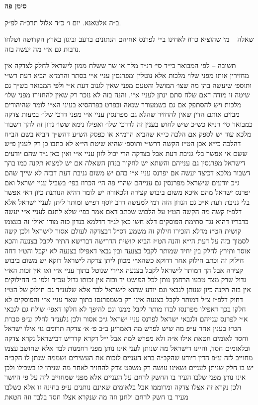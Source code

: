 \documentclass[12pt, openany]{book}
\newcommand{\chapname}{}
\newcommand{\newchap}[1]{
	\addcontentsline{toc}{chapter}{#1}
	\renewcommand{\chapname}{#1}
		\begin{center}
			\textbf{%
\fontsize{16pt}{16pt}\selectfont
				#1}
		\end{center}
}
\begin{document}
\newchap{סימן פה}
\begin{multicols}{2}
ב״ה אלטאנא. יום ו׳ כ״ד אלול תרכ״ה לפ״ק.\\\vspace{0pt}

שאלה – מי שהוציא כרוז לאחינו ב״י לפרנס אחיהם הנתונים ברעב וביגון בארץ הקדושה ושלחו נדבות גם א״י מה יעשה בזה.\\\vspace{0pt}

תשובה – לפי המבואר בי״ד סי׳ רנ״ד מלך או שר ששלח ממון לישראל לחלק לצדקה אין מחזירין אותו מפני שלו׳ מלכות אלא נוטלין ומפרנסין עניי א״י בסתר והרמ״א הביא דעת רש״י ותוספ׳ שיעשה בהן מה שצו׳ המושל והטעם מפני שאין לגנוב דעת א״י ולפי המבואר בש״ך גם שיטה זו מודה דאם שלח סתם ינתן לעניי א״י. והנה בזה לא נזכר רק שאין להחזירו מפני שלו׳ מלכות ויש להסתפק אם גם כשמעורר שנאה ובפרט בפרהסיא בעיני הא״י לומר שהיהודים מבזים אותם הדין שאין להחזיר שהלא גם מפרנסין עניי א״י מפני דרכי שלו׳ במעות צדקה כמבואר סי׳ רנ״א כש״כ שיש לחוש בענין זה לדרכי שלו׳ ואפילו נימא ששו׳ נדון זה להך דשבור מלכא עוד יש לספק אם הלכה כי״א שהביא הרמ״א או כפסק הש״ע דהש״ך הביא בשם הב״ח דהלכה כי״א אכן הט״ז הקשה דרש״י ותוספ׳ שהיא שיטת הי״א לא כתבו כן רק לענין פ״ש ששם אי אפשר בלי גניבת דעת אבל בצדקה הרי יכול לזון עניי א״י ואין כאן ג״ד שהם יודעים דישראל מפרנסין גם ענייהם והשתא יש לחקור בנדון השאלה אם יש למצוא תקנה כמו בהך דשבור מלכא דכיצד יעשה אם יפרנס עניי א״י בהם יש משום גניבת דעת דבזה לא שייך שהם ג״כ יודעים שישראל מפרנסין גם ענייהם שהרי פה הי׳ הכרוז בפי׳ בשביל עניי ישראל ואם יפרנס ישראל מהם איכא משום ביבוש קצירה ולכאורה יש לומר דהיא הנותנת כיון דאי אפשר בלי גניבת דעת א״כ גם הנדון הזה דמי למעשה דרב יוסף דפ״ש ומותר ליתן לעניי ישראל אלא דלפ״ז קשה מה הקשה הט״ז על הלבוש שכתב דאם אמר בפי׳ שלא לתנם לעניי א״י יעשה כדבריו דהוא נגד סתימת הפוסקים דלא חשו כאן לג״ד דדלמא בנדון כזה מודו ואולי זה בעצמו קושית הט״ז מדלא הזכירו חילוק זה משמע דס״ל דבצדקה לעולם אסור לישראל ולכן קשה לסמוך בזה על דעת הי״א והנה הט״ז הביא קושית הדרישה דברישא התיר לקבל בצנעה והכא אוסר ותירץ לחלק בין יחיד שמותר לקבל בצנעה ובין גבאי דאפילו בצנעה לא יקבל והט״ז דחה חילוק זה וכתב חילוק אחר דדוקא כשהא״י מכוון ליתן צדקה לישראל דוקא יש משום ביבוש קצירה אבל הך דמותר לישראל לקבל בצנעה איירי שנוטל בתוך עניי א״י ואז אין זכות הא״י גדול שרק מצד טבעו הרחמן נותן לכל הפושט יד ובזה אין זכותו גדול עכ״ד ולפי ב׳ החילוקים אין בזה תקנה כיון שנותן לגבאי וגם יודע שהוא לישראל לבד אלא שלענ״ד גם חילוק של הט״ז דחוק דלפ״ז צ״ל דמותר לקבל בצנעה אינו רק כשמפרנסו בתוך שאר עניי א״י והפוסקים לא חלקו בכך דאפילו מפרנסו לבדו מותר לקבל ממנו וגם להיפך לא חלקו דאפי׳ שולח גם לגבאי א״י לפרנס ענייהם ולגבאי ישראל לפרנס עניי ישראל ג״כ אסור ולכן נלענ״ד לחלק ע״פ סברת הט״ז בענין אחר ע״פ מה שיש לפרש מה דאמרינן ב״ב פ׳ א׳ צדקה תרומם גוי אילו ישראל וחסד לאומים חטאת אילו א״ה ולא מפרש למה אבל י״ל דקרא קדריש דבישראל נקרא צדקה ובלאומים חסד, והיינו דישראל מה שנותן לעני אינו נותן מפני רחמנות לבד אלא שחושב עצמו מחוייב לזה ע״פ הדין דיודע שהקב״ה ברא העניים לזכות את העשירים ושממה שנתן לו הקב״ה יש בו חלק שניתן לעניים ושאינו עושה רק משפט צדק להחזיר לאחר מה שניתן לו בשבילו ולכן אינו נותן מפני שלבו העיר בו החשק לרחם על העניים אלא מפני שמחוייב לזה על פי היושר ולכן נקרא זה אצלו צדקה ומרוממו אבל בלאומים שאינם נותנים ע״פ בחינה זו אלא כשלבו מעיר בו חשק לרחם ולחנן וזה מה שנקרא אצלו חסד בלבד וזה חטאת 
\end{multicols}
\end{document}
